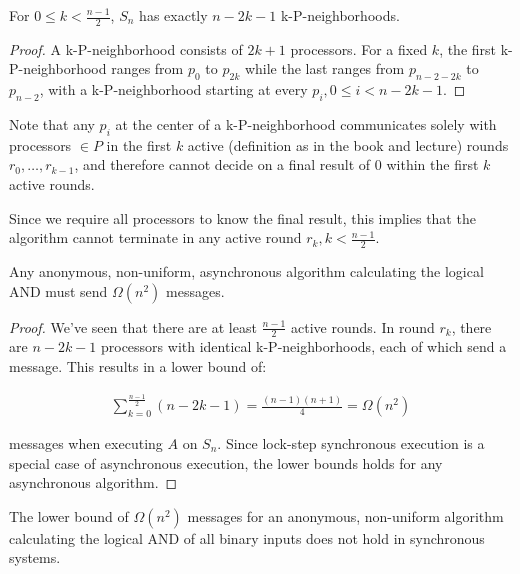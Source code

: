 \begin{lemma} \label{lemma:nrkpneighborhoods}
For $0 \leq k < \frac{n-1}{2}$, $S_n$ has exactly $n-2k-1$ k-P-neighborhoods.
\end{lemma}

\begin{proof}
A k-P-neighborhood consists of $2k + 1$ processors. For a fixed $k$, the first
k-P-neighborhood ranges from $p_0$ to $p_{2k}$ while the last ranges from $p_{n-2-2k}$
to $p_{n-2}$, with a k-P-neighborhood starting at every $p_i, 0 \leq i < n - 2k - 1$.
\end{proof}

Note that any $p_i$ at the center of a k-P-neighborhood communicates solely with
processors $\in P$ in the first $k$ active (definition as in the book and lecture)
rounds $r_0, \ldots, r_{k-1}$, and therefore cannot decide on a final result of $0$ within the first $k$
active rounds.

Since we require all processors to know the final result, this implies that the
algorithm cannot terminate in any active round $r_k, k < \frac{n-1}{2}$.


\begin{theorem}
Any anonymous, non-uniform, asynchronous algorithm calculating the logical AND
must send $\Omega(n^2)$ messages.
\end{theorem}

\begin{proof}
We've seen that there are at least $\frac{n-1}{2}$ active rounds. In round $r_k$,
there are $n-2k-1$ processors with identical k-P-neighborhoods, each of which
send a message. This results in a lower bound of:

\begin{align}
\sum_{k = 0}^{\frac{n-1}{2}} (n-2k-1) = \frac{(n-1)(n+1)}{4} = \Omega(n^2)
\end{align}

messages when executing $A$ on $S_n$. Since lock-step synchronous execution
is a special case of asynchronous execution, the lower bounds holds for
any asynchronous algorithm.
\end{proof}


\begin{theorem}
The lower bound of $\Omega(n^2)$ messages for an anonymous, non-uniform algorithm calculating the
logical AND of all binary inputs does not hold in synchronous systems.
\end{theorem}

